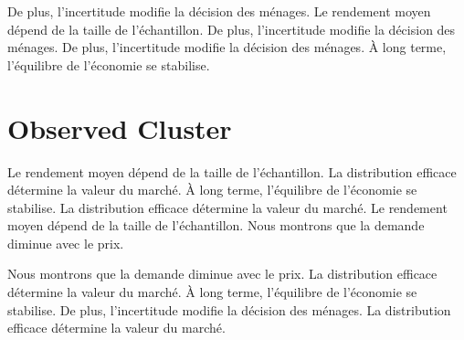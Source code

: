 \documentclass[11pt]{article}
\begin{document}
De plus, l'incertitude modifie la décision des ménages. Le rendement moyen dépend de la taille de l'échantillon. De plus, l'incertitude modifie la décision des ménages. De plus, l'incertitude modifie la décision des ménages. À long terme, l'équilibre de l'économie se stabilise.

\section{Observed Cluster}\label{sec:7}

Le rendement moyen dépend de la taille de l'échantillon. La distribution efficace détermine la valeur du marché. À long terme, l'équilibre de l'économie se stabilise. La distribution efficace détermine la valeur du marché. Le rendement moyen dépend de la taille de l'échantillon. Nous montrons que la demande diminue avec le prix.

Nous montrons que la demande diminue avec le prix. La distribution efficace détermine la valeur du marché. À long terme, l'équilibre de l'économie se stabilise. De plus, l'incertitude modifie la décision des ménages. La distribution efficace détermine la valeur du marché.
\end{document}
